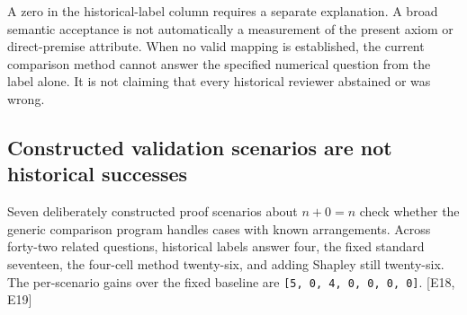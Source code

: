 A zero in the historical-label column requires a separate explanation. A broad semantic acceptance is not automatically a measurement of the present axiom or direct-premise attribute. When no valid mapping is established, the current comparison method cannot answer the specified numerical question from the label alone. It is not claiming that every historical reviewer abstained or was wrong.

\subsection[Constructed validation scenarios are not historical successes]{\texorpdfstring{\protect\hypertarget{d8}{}Constructed validation scenarios are not historical successes}{Constructed validation scenarios are not historical successes}}
Seven deliberately constructed proof scenarios about $n+0=n$ check whether the generic comparison program handles cases with known arrangements. Across forty-two related questions, historical labels answer four, the fixed standard seventeen, the four-cell method twenty-six, and adding Shapley still twenty-six. The per-scenario gains over the fixed baseline are \nolinkurl{[5, 0, 4, 0, 0, 0, 0]}. [E18, E19]

